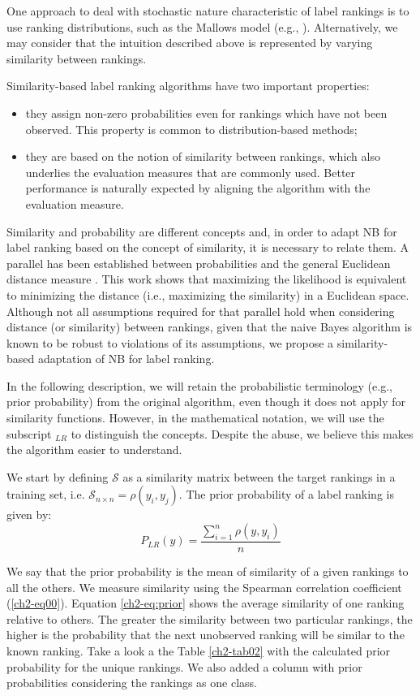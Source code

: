 One approach to deal with stochastic nature characteristic of label rankings is to use ranking distributions, such as the Mallows model (e.g., \citep{lebanon2002,cheng2009}). Alternatively, we may consider that the intuition described above is represented by varying similarity between rankings.

Similarity-based label ranking algorithms have two important properties:
\begin{itemize}
\item they assign non-zero probabilities even for rankings which have not been observed. This property is common to distribution-based methods;
\item they are based on the notion of similarity between rankings, which also underlies the evaluation measures that are commonly used. Better performance is naturally expected by aligning the algorithm with the evaluation measure.
\end{itemize}

Similarity and probability are different concepts and, in order to adapt NB for label ranking based on the concept of similarity, it is necessary to relate them. A parallel has been established between probabilities and the general Euclidean distance measure \citep{vogt2007}. This work shows that maximizing the likelihood is equivalent to minimizing the distance (i.e., maximizing the similarity) in a Euclidean space.  Although not all assumptions required for that parallel hold when considering distance (or similarity) between rankings, given that the naive Bayes algorithm is known to be robust to violations of its assumptions, we propose a similarity-based adaptation of NB for label ranking.


In the following description, we will retain the probabilistic terminology (e.g., prior probability) from the original algorithm, even though it does not apply for similarity functions. However, in the mathematical notation, we will use the subscript $_{LR}$ to distinguish the concepts. Despite the abuse, we believe this makes the algorithm easier to understand.

We start by defining $\mathcal{S}$ as a similarity matrix between the target rankings in a training set, i.e. $\mathcal{S}_{n \times n}=\rho(y_i,y_j)$. The prior probability of a label ranking is given by:
\begin{equation}
P_{LR}(y) = \frac{\sum_{i=1}^{n} \rho(y,y_i)}{n}
\label{ch2-eq:prior}
\end{equation}

We say that the prior probability is the mean of similarity of a given rankings to all the others. We measure similarity  using the Spearman correlation coefficient (\ref{ch2-eq00}). Equation \ref{ch2-eq:prior} shows the average similarity of one ranking relative to others. The greater the similarity between two particular rankings, the higher is the probability that the next unobserved  ranking will be similar to the known ranking. Take a look a the Table \ref{ch2-tab02} with the calculated prior probability for the unique rankings. We also added a column with prior probabilities considering the rankings as one class.

